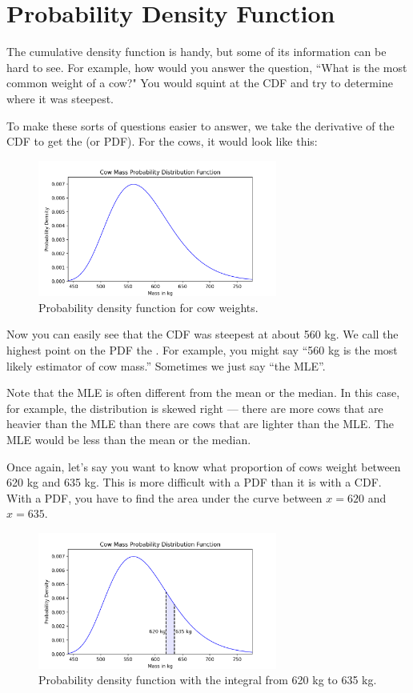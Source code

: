 \section{Probability Density Function}
The cumulative density function is handy,  but some of its information can be hard to see. For example, how would you answer the question, ``What is the most common weight of a cow?"  You would
squint at the CDF and try to determine where it was steepest.

To make these sorts of questions easier to answer,  we take the derivative of the CDF to get the  (or PDF). For the cows,  it would look like this:
\begin{figure}[htbp]
    \centering
    \includegraphics[width=0.7\textwidth]{cow_pdf.png}
    \caption{Probability density function for cow weights.}
    \label{fig:cowpdf}
\end{figure}

Now you can easily see that the CDF was steepest at about 560 kg. We call the highest point on the PDF the . For example, you might say ``560 kg is the most likely estimator of cow mass.''  Sometimes we just say ``the MLE''.  

Note that the MLE is often different from the mean or the median. In this case, for example,  the distribution is skewed right --- there are more cows that are heavier than the 
MLE than there are cows that are lighter than the MLE. The MLE would be less than the mean or the median.

Once again,  let's say you want to know what proportion of cows weight between 620 kg and 635 kg. This is more difficult with a PDF than it is with a CDF. With a PDF,  you have to find
the area under the curve between $x=620$ and $x=635$. 

\begin{figure}[htbp]
    \centering
    \includegraphics[width=0.7\textwidth]{cow_pdf_bounds.png}
    \caption{Probability density function with the integral from 620 kg to 635 kg.}
    \label{fig:cowpdfintegral}
\end{figure}

